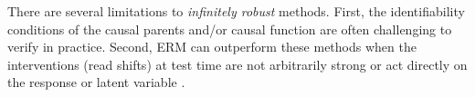 There are several limitations to  \emph{infinitely robust} methods. First, the identifiability conditions of the causal parents and/or causal function are often challenging to verify in practice.
Second, ERM can outperform these methods when the interventions (read shifts) at test time are not arbitrarily strong or act directly on the response or latent variable \citep{ahuja2020empirical, gulrajani2021in}.
